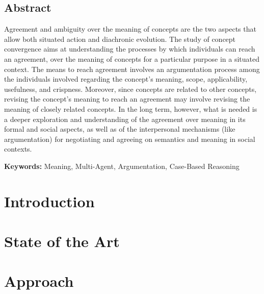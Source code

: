 \documentclass{report}
\begin{document}
\section*{Abstract}

Agreement and ambiguity over the meaning of concepts are the two aspects that allow both situated action and diachronic evolution. The study of concept convergence aims at understanding the processes by which individuals can reach an agreement, over the meaning of concepts for a particular purpose in a situated context. The means to reach agreement involves an argumentation process among the individuals involved regarding the concept's meaning, scope, applicability, usefulness, and crispness. Moreover, since concepts are related to other concepts, revising the concept's meaning to reach an agreement may involve revising the meaning of closely related concepts. In the long term, however, what is needed is a deeper exploration and understanding of the agreement over meaning in its formal and social aspects, as well as of the interpersonal mechanisms (like argumentation) for negotiating and agreeing on semantics and meaning in social contexts.

\vspace{5mm}
\textbf{Keywords:} Meaning, Multi-Agent, Argumentation, Case-Based Reasoning


\vspace{3cm}

\tableofcontents

\newpage



\chapter{Introduction}\label{Introduction}


\chapter{State of the Art}\label{StateOfTheArt}


\chapter{Approach}\label{Approach}

\end{document}
